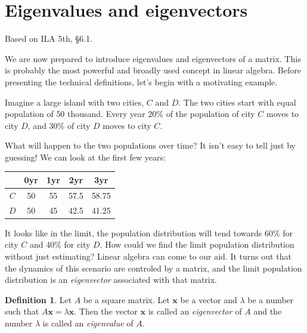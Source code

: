 \documentclass[11pt,oneside]{amsbook}
\theoremstyle{definition}
\theoremstyle{plain}
\theoremstyle{definition}
\newtheorem{definition}[theorem]{Definition}
\theoremstyle{remark}
\numberwithin{equation}{section}
\numberwithin{figure}{section}
\begin{document}
\newpage
\section{Eigenvalues and eigenvectors}

Based on ILA 5th, \S 6.1.

We are now prepared to introduce eigenvalues and eigenvectors of a matrix. This is probably the most powerful and broadly used concept in linear algebra. Before presenting the technical definitions, let's begin with a motivating example.

Imagine a large island with two cities, $C$ and $D$. The two cities start with equal population of $50$ thousand. Every year 20\% of the population of city $C$ moves to city $D$, and 30\% of city $D$ moves to city $C$.
\begin{center}
\end{center}
What will happen to the two populations over time? It isn't easy to tell just by guessing! We can look at the first few years:
\begin{center}
  \begin{tabular}{ccccc}
     & 0yr & 1yr & 2yr & 3yr \\\hline
    $C$ & 50 & 55 & 57.5 & 58.75 \\
    $D$ & 50 & 45 & 42.5 & 41.25
  \end{tabular}
\end{center}
It looks like in the limit, the population distribution will tend towards 60\% for city $C$ and 40\% for city $D$. How could we find the limit population distribution without just estimating? Linear algebra can come to our aid. It turns out that the dynamics of this scenario are controled by a matrix, and the limit population distribution is an \emph{eigenvector} associated with that matrix.

\begin{definition}
  Let $A$ be a square matrix. Let $\mathbf{x}$ be a vector and $\lambda$ be a number such that $A\mathbf{x}=\lambda\mathbf{x}$. Then the vector $\mathbf x$ is called an \emph{eigenvector} of $A$ and the number $\lambda$ is called an \emph{eigenvalue} of $A$.
\end{definition}
\end{document}

